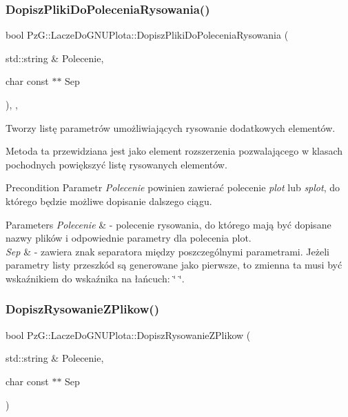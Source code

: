 \subsubsection{\texorpdfstring{Dopisz\+Pliki\+Do\+Polecenia\+Rysowania()}{DopiszPlikiDoPoleceniaRysowania()}}
{\footnotesize\ttfamily bool Pz\+G\+::\+Lacze\+Do\+G\+N\+U\+Plota\+::\+Dopisz\+Pliki\+Do\+Polecenia\+Rysowania (\begin{DoxyParamCaption}\item[{std\+::string \&}]{Polecenie,  }\item[{char const $\ast$$\ast$}]{Sep }\end{DoxyParamCaption})\hspace{0.3cm}{\ttfamily [inline]}, {\ttfamily [protected]}, {\ttfamily [virtual]}}



Tworzy listę parametrów umożliwiających rysowanie dodatkowych elementów. 

Metoda ta przewidziana jest jako element rozszerzenia pozwalającego w klasach pochodnych powiększyć listę rysowanych elementów. \begin{DoxyPrecond}{Precondition}
Parametr {\itshape Polecenie} powinien zawierać polecenie {\itshape plot} lub {\itshape splot}, do którego będzie możliwe dopisanie dalszego ciągu. 
\end{DoxyPrecond}

\begin{DoxyParams}{Parameters}
{\em Polecenie} & -\/ polecenie rysowania, do którego mają być dopisane nazwy plików i odpowiednie parametry dla polecenia plot. \\
\hline
{\em Sep} & -\/ zawiera znak separatora między poszczególnymi parametrami. Jeżeli parametry listy przeszkód są generowane jako pierwsze, to zmienna ta musi być wskaźnikiem do wskaźnika na łańcuch\+: \char`\"{} \char`\"{}. \\
\hline
\end{DoxyParams}
\mbox{\label{classPzG_1_1LaczeDoGNUPlota_ad3d7607946b82aa941d786dcd086d27e}} 
\subsubsection{\texorpdfstring{Dopisz\+Rysowanie\+Z\+Plikow()}{DopiszRysowanieZPlikow()}}
{\footnotesize\ttfamily bool Pz\+G\+::\+Lacze\+Do\+G\+N\+U\+Plota\+::\+Dopisz\+Rysowanie\+Z\+Plikow (\begin{DoxyParamCaption}\item[{std\+::string \&}]{Polecenie,  }\item[{char const $\ast$$\ast$}]{Sep }\end{DoxyParamCaption})}



